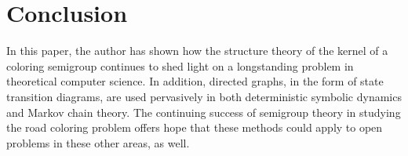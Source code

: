 
\section{Conclusion}
\label{sec:4.7}

In this paper, the author has shown how the structure theory of the kernel of a coloring semigroup continues to shed light on a longstanding problem in theoretical computer science.  
In addition, directed graphs, in the form of state transition diagrams, are used pervasively in both deterministic symbolic dynamics and Markov chain theory. 
The continuing success of semigroup theory in studying the road coloring problem offers hope that these methods could apply to open problems in these other areas, as well.

